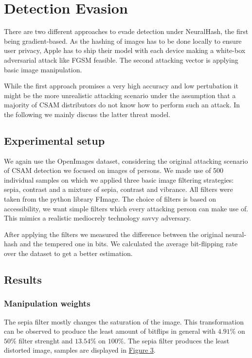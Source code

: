\documentclass[10pt,twocolumn,letterpaper]{article}
\begin{document}
\section{Detection Evasion}
\label{sec:detec_evad}

There are two different approaches to evade detection under NeuralHash, the first being gradient-based. As the hashing of images has to be done locally to ensure user privacy, Apple has to ship their model with each device making a white-box adversarial attack like FGSM feasible. The second attacking vector is applying basic image manipulation. 

While the first approach promises a very high accuracy and low pertubation it might be the more unrealistic attacking scenario under the assumption that a majority of CSAM distributors do not know how to perform such an attack. In the following we mainly discuss the latter threat model. 

\subsection{Experimental setup}

We again use the OpenImages dataset, considering the original attacking scenario of CSAM detection we focused on images of persons.  We made use of 500 individual samples on which we applied three basic image filtering strategies: sepia, contrast and a mixture of sepia, contrast and vibrance. All filters were taken from the python library FImage. The choice of filters is based on accessibility, we want simple filters which every attacking person can make use of. This mimics a realistic mediocrely technology savvy adversary.

After applying the filters we measured the difference between the original neural-hash and the tempered one in bits. We calculated the average bit-flipping rate over the dataset to get a better estimation.

\subsection{Results}

\subsubsection{Manipulation weights}

The sepia filter mostly changes the saturation of the image. This transformation can be observed to produce the least amount of bitflips in general with $4.91\%$ on $50\%$ filter strenght and $13.54\%$ on $100\%$. The sepia filter produces the least distorted image, samples are displayed in \hyperref[fig:three]{Figure 3}.
\end{document}
